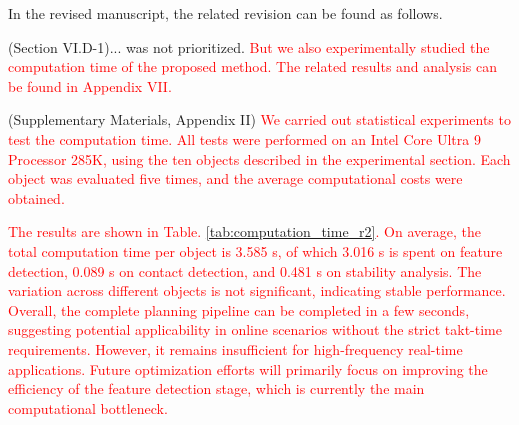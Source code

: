 \documentclass[journal]{IEEEtran}
\newcommand{\rev}[1]{\textcolor{red}{#1}}
\begin{document}
In the revised manuscript, the related revision can be found as follows.

(Section VI.D-1)...
was not prioritized. \rev{But we also experimentally studied the computation time of the proposed method. The related results and analysis can be found in Appendix VII.}

(Supplementary Materials, Appendix II)
\rev{We carried out statistical experiments to test the computation time. All tests were performed on an Intel Core Ultra 9 Processor 285K, using the ten objects described in the experimental section. Each object was evaluated five times, and the average computational costs were obtained.}

\rev{The results are shown in Table. \ref{tab:computation_time_r2}. On average, the total computation time per object is 3.585 s, of which 3.016 s is spent on feature detection, 0.089 s on contact detection, and 0.481 s on stability analysis. The variation across different objects is not significant, indicating stable performance. Overall, the complete planning pipeline can be completed in a few seconds, suggesting potential applicability in online scenarios without the strict takt-time requirements. However, it remains insufficient for high-frequency real-time applications.
Future optimization efforts will primarily focus on improving the efficiency of the feature detection stage, which is currently the main computational bottleneck.}




\end{document}
